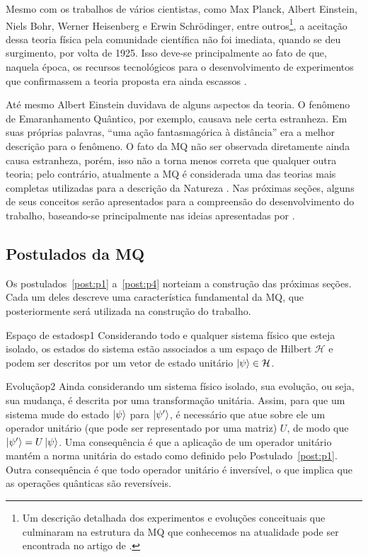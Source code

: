 Mesmo com os trabalhos de vários cientistas, como Max Planck, Albert Einstein, Niels Bohr, Werner Heisenberg e Erwin Schrödinger, entre outros\footnote{Um descrição detalhada dos experimentos e evoluções conceituais que culminaram na estrutura da MQ que conhecemos na atualidade pode ser encontrada no artigo de \textcite{chibeni}.}, a aceitação dessa teoria física pela comunidade científica não foi imediata, quando se deu surgimento, por volta de 1925. Isso deve-se principalmente ao fato de que, naquela época, os recursos tecnológicos para o desenvolvimento de experimentos que confirmassem a teoria proposta era ainda escassos \cite{chibeni}.

Até mesmo Albert Einstein duvidava de alguns aspectos da teoria. O fenômeno de Emaranhamento Quântico, por exemplo, causava nele certa estranheza. Em suas próprias palavras, ``uma ação fantasmagórica à distância'' era a melhor descrição para o fenômeno. O fato da MQ não ser observada diretamente ainda causa estranheza, porém, isso não a torna menos correta que qualquer outra teoria; pelo contrário, atualmente a MQ é considerada uma das teorias mais completas utilizadas para a descrição da Natureza \cite{chuang}. Nas próximas seções, alguns de seus conceitos serão apresentados para a compreensão do desenvolvimento do trabalho, baseando-se principalmente nas ideias apresentadas por \textcite{chuang,jorcuvich,CompInfoQuantica,grif}.


\subsection{Postulados da MQ}\label{sec:postulados}

Os postulados~\ref{post:p1} a~\ref{post:p4} norteiam a construção das próximas seções. Cada um deles descreve uma característica fundamental da MQ, que posteriormente será utilizada na construção do trabalho.

\begin{post}{Espaço de estados}{p1}
Considerando todo e qualquer sistema físico que esteja isolado, os estados do sistema estão associados a um espaço de Hilbert $\mathcal{H}$ e podem ser descritos por um vetor de estado unitário $\ket{\psi} \in \mathcal{H}$.
\end{post}

\begin{post}{Evolução}{p2}
Ainda considerando um sistema físico isolado, sua evolução, ou seja, sua mudança, é descrita por uma transformação unitária. Assim, para que um sistema mude do estado $\ket{\psi}$ para $\ket{\psi'}$, é necessário que atue sobre ele um operador unitário (que pode ser representado por uma matriz) \(U\), de modo que $\ket{\psi'}=U\ket{\psi}$. Uma consequência é que a aplicação de um operador unitário mantém a norma unitária do estado como definido pelo Postulado~\ref{post:p1}. Outra consequência é que todo operador unitário é inversível, o que implica que as operações quânticas são reversíveis.
\end{post}

